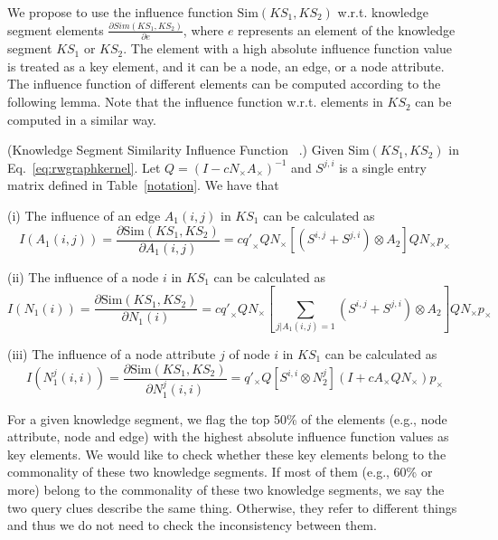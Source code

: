 We propose to use the influence function $\textrm{Sim}(KS_1 , KS_2)$ w.r.t. knowledge segment elements
 $\frac{\partial{Sim(KS_1, KS_2)}}{\partial {e}}$,
where $e$ represents an element of the knowledge segment $KS_1$ or $KS_2$.
The element with a high absolute influence function value is treated as a key element, and it can be a node, an edge, or a node attribute.
The influence function of different elements can be computed according to the following lemma.
Note that the influence function w.r.t. elements in $KS_2$ can be computed in a similar way.
\vspace{-0.3\baselineskip}
\begin{lemma}\label{lm:influence}\noindent (Knowledge Segment Similarity Influence Function ~\cite{qinghai}.)
Given $\textrm{Sim}(KS_1, KS_2)$
in Eq.~\eqref{eq:rwgraphkernel}.
Let $Q = (I - c N_{\times} A_{\times})^{-1}$ and $S^{j,i}$ is a single entry matrix defined in Table~\ref{notation}.
We have that
\item [] (i) The influence of an edge $A_1(i,j)$ in $KS_1$ can be calculated as
\begin{equation}
    I(A_1(i,j))= \frac{\partial \textrm{Sim}(KS_1, KS_2)}{\partial A_1(i,j)} =
c {q'}_{\times}QN_{\times}[(S^{i,j} + S^{j,i})\otimes A_2]QN_{\times}p_{\times}
\end{equation}


\item [] (ii) The influence of a node $i$ in $KS_1$ can be calculated as
\begin{equation}
    I(N_1(i)) = \frac{\partial \textrm{Sim}(KS_1, KS_2)}{\partial N_1(i)} =
c {q'}_{\times}QN_{\times}[\sum_{j|A_1(i,j)=1}(S^{i,j} + S^{j,i})\otimes A_2]QN_{\times}p_{\times}
\end{equation}


\item [] (iii) The influence of a node attribute $j$ of node $i$ in $KS_1$ can be calculated as
\begin{equation}
    I(N_1^j(i, i)) = \frac{\partial \textrm{Sim}(KS_1, KS_2)}{\partial N_1^j(i, i)} =
q'_{\times}Q[S^{i,i}\otimes N_2^j](I + c A_{\times}QN_{\times})p_{\times}
\end{equation}


\end{lemma}
\vspace{-0.3\baselineskip}



For a given knowledge segment, we flag the top 50\% of the elements (e.g., node attribute, node and edge) with the highest absolute influence function values as key elements.
We would like to check whether these key elements belong to the commonality of these two knowledge segments. If most of them (e.g., 60\% or more) belong to the commonality of these two knowledge segments, we say the two query clues describe the same thing. Otherwise, they refer to different things and thus we do not need to check the inconsistency between them.

